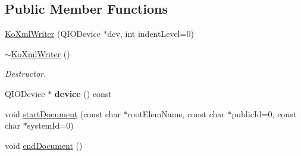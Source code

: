 \subsection*{Public Member Functions}
\begin{DoxyCompactItemize}
\item 
\hyperlink{classKoXmlWriter_a533f9617e577fd34b4a4c7ad9fe23255}{KoXmlWriter} (QIODevice $\ast$dev, int indentLevel=0)
\item 
\hypertarget{classKoXmlWriter_a0af2dc9077618677116a0fe22b6f8951}{
\hyperlink{classKoXmlWriter_a0af2dc9077618677116a0fe22b6f8951}{$\sim$KoXmlWriter} ()}
\label{classKoXmlWriter_a0af2dc9077618677116a0fe22b6f8951}

\begin{DoxyCompactList}\small\item\em Destructor. \item\end{DoxyCompactList}\item 
\hypertarget{classKoXmlWriter_a43b736aa4bfa08765e0648d6fb5758ed}{
QIODevice $\ast$ {\bfseries device} () const }
\label{classKoXmlWriter_a43b736aa4bfa08765e0648d6fb5758ed}

\item 
void \hyperlink{classKoXmlWriter_a867932c8d3bbecd712572230cb0b64cd}{startDocument} (const char $\ast$rootElemName, const char $\ast$publicId=0, const char $\ast$systemId=0)
\item 
\hypertarget{classKoXmlWriter_a5ab08b557107287ecc4e1f6528a79843}{
void \hyperlink{classKoXmlWriter_a5ab08b557107287ecc4e1f6528a79843}{endDocument} ()}
\label{classKoXmlWriter_a5ab08b557107287ecc4e1f6528a79843}


\end{DoxyCompactItemize}
